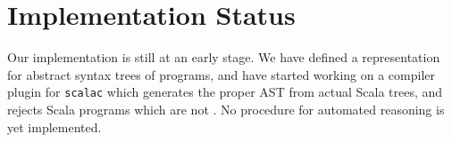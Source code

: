 \section{Implementation Status}
Our implementation is still at an early stage. We have defined a representation
for abstract syntax trees of {\purescala} programs, and have started working on
a compiler plugin for {\tt scalac} which generates the proper AST from actual
Scala trees, and rejects Scala programs which are not {\purescala}. No
procedure for automated reasoning is yet implemented.
